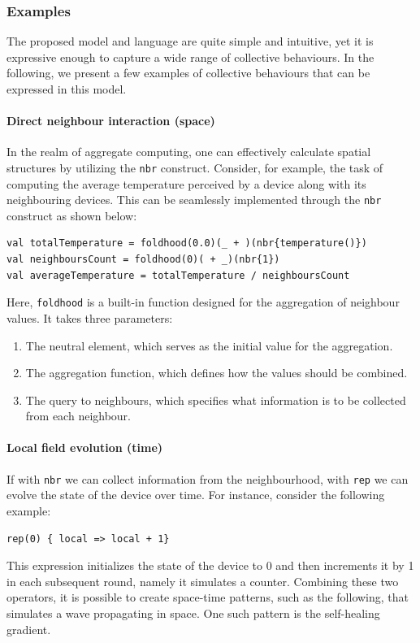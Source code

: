 \subsubsection{Examples}
\label{sec:field-calculus-foundational-behaviour}
The proposed model and language are quite simple and intuitive, 
 yet it is expressive enough to capture a wide range of collective behaviours.
In the following, we present a few examples of collective behaviours that can be expressed in this model.
\paragraph*{Direct neighbour interaction (space)}
In the realm of aggregate computing, 
 one can effectively calculate spatial structures by utilizing the \texttt{nbr} construct. 
 Consider, for example, the task of computing the average temperature perceived by a device along with its neighbouring devices. 
 This can be seamlessly implemented through the \texttt{nbr} construct as shown below:
\begin{lstlisting}[language=scafi]
val totalTemperature = foldhood(0.0)(_ + )(nbr{temperature()})
val neighboursCount = foldhood(0)( + _)(nbr{1})
val averageTemperature = totalTemperature / neighboursCount
\end{lstlisting}
Here, \texttt{foldhood} is a built-in function designed for the aggregation of neighbour values. 
It takes three parameters:
\begin{enumerate}
\item The neutral element, which serves as the initial value for the aggregation.
\item The aggregation function, which defines how the values should be combined.
\item The query to neighbours, which specifies what information is to be collected from each neighbour.
\end{enumerate} 
\paragraph*{Local field evolution (time)}
If with \texttt{nbr} we can collect information from the neighbourhood, 
 with \texttt{rep} we can evolve the state of the device over time. 
 For instance, consider the following example:
\begin{lstlisting}[language=scafi]
rep(0) { local => local + 1}
\end{lstlisting}
This expression initializes the state of the device to 0 and then increments it by 1 in each subsequent round, namely it simulates a counter.
Combining these two operators, it is possible to create space-time patterns, 
 such as the following, that simulates a wave propagating in space.
 One such pattern is the self-healing gradient.
